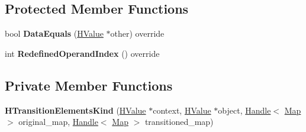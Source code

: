 \subsection*{Protected Member Functions}
\begin{DoxyCompactItemize}
\item 
bool {\bfseries Data\+Equals} (\hyperlink{classv8_1_1internal_1_1_h_value}{H\+Value} $\ast$other) override\hypertarget{classv8_1_1internal_1_1_h_transition_elements_kind_a1db1a3408de1a6c803b9efb00ab5f70d}{}\label{classv8_1_1internal_1_1_h_transition_elements_kind_a1db1a3408de1a6c803b9efb00ab5f70d}

\item 
int {\bfseries Redefined\+Operand\+Index} () override\hypertarget{classv8_1_1internal_1_1_h_transition_elements_kind_a73639c81ea9a992d63cfb5a5280e4a34}{}\label{classv8_1_1internal_1_1_h_transition_elements_kind_a73639c81ea9a992d63cfb5a5280e4a34}

\end{DoxyCompactItemize}
\subsection*{Private Member Functions}
\begin{DoxyCompactItemize}
\item 
{\bfseries H\+Transition\+Elements\+Kind} (\hyperlink{classv8_1_1internal_1_1_h_value}{H\+Value} $\ast$context, \hyperlink{classv8_1_1internal_1_1_h_value}{H\+Value} $\ast$object, \hyperlink{classv8_1_1internal_1_1_handle}{Handle}$<$ \hyperlink{classv8_1_1internal_1_1_map}{Map} $>$ original\+\_\+map, \hyperlink{classv8_1_1internal_1_1_handle}{Handle}$<$ \hyperlink{classv8_1_1internal_1_1_map}{Map} $>$ transitioned\+\_\+map)\hypertarget{classv8_1_1internal_1_1_h_transition_elements_kind_ab62e4466f726ad34d71f8e3ca17d4599}{}\label{classv8_1_1internal_1_1_h_transition_elements_kind_ab62e4466f726ad34d71f8e3ca17d4599}

\end{DoxyCompactItemize}
